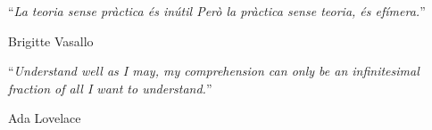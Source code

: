 \documentclass[
11pt, %
english, %
onehalfspacing %
]{MastersDoctoralThesis} %
\begin{document}
\noindent\enquote{\itshape La teoria sense pràctica és inútil
Però la pràctica sense teoria, és efímera.}\bigbreak

\hfill Brigitte Vasallo

\noindent\enquote{\itshape Understand well as I may, my comprehension can only be an infinitesimal fraction of all I want to understand.}

\hfill Ada Lovelace



\begin{abstract}
\addchaptertocentry{\abstractname} %

%

\end{abstract}


\begin{resum}
\addchaptertocentry{\resumname} %

%

\end{resum}

\end{document}

